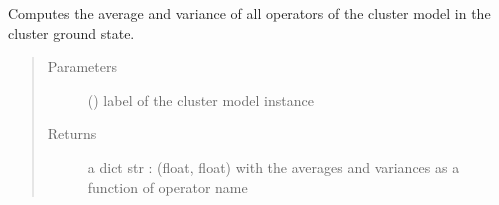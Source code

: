 \documentclass[letterpaper,10pt,english]{sphinxmanual}
\begin{document}

\begin{fulllineitems}
\label{\detokenize{functions:pyqcm.cluster_averages}}
\sphinxAtStartPar
Computes the average and variance of all operators of the cluster model in the cluster ground state.
\begin{quote}\begin{description}
\item[{Parameters}] \leavevmode
\sphinxAtStartPar
{} () \textendash{} label of the cluster model instance

\item[{Returns}] \leavevmode
\sphinxAtStartPar
a dict str : (float, float) with the averages and variances as a function of operator name

\end{description}\end{quote}

\end{fulllineitems}

\end{document}
